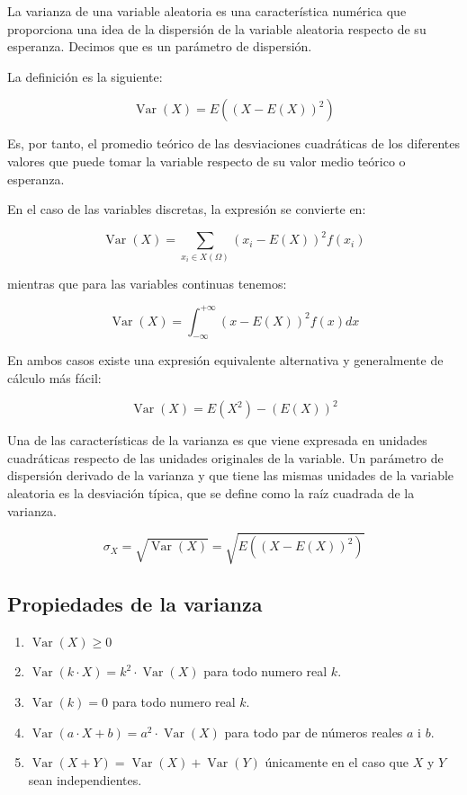\documentclass[
  a4paper,
  DIV=11,
  numbers=noendperiod]{scrreprt}
\providecommand{\tightlist}{%
  \setlength{\itemsep}{0pt}\setlength{\parskip}{0pt}}\usepackage{longtable,booktabs,array}
\begin{document}
La varianza de una variable aleatoria es una característica numérica que
proporciona una idea de la dispersión de la variable aleatoria respecto
de su esperanza. Decimos que es un parámetro de dispersión.

La definición es la siguiente:

\[
\operatorname{Var}(X)=E\left((X-E(X))^{2}\right)
\]

Es, por tanto, el promedio teórico de las desviaciones cuadráticas de
los diferentes valores que puede tomar la variable respecto de su valor
medio teórico o esperanza.

En el caso de las variables discretas, la expresión se convierte en:

\[
\operatorname{Var}(X)=\sum_{x_{i} \in X(\Omega)}\left(x_{i}-E(X)\right)^{2} f\left(x_{i}\right)
\]

mientras que para las variables continuas tenemos:

\[
\operatorname{Var}(X)=\int_{-\infty}^{+\infty}(x-E(X))^{2} f(x) d x
\]

En ambos casos existe una expresión equivalente alternativa y
generalmente de cálculo más fácil:

\[
\operatorname{Var}(X)=E\left(X^{2}\right)-(E(X))^{2}
\]

Una de las características de la varianza es que viene expresada en
unidades cuadráticas respecto de las unidades originales de la variable.
Un parámetro de dispersión derivado de la varianza y que tiene las
mismas unidades de la variable aleatoria es la desviación típica, que se
define como la raíz cuadrada de la varianza.

\[
\sigma_{X}=\sqrt{\operatorname{Var}(X)}=\sqrt{E\left((X-E(X))^{2}\right)}
\]

\subsection{Propiedades de la
varianza}\label{propiedades-de-la-varianza}

\begin{enumerate}
\def\labelenumi{\arabic{enumi}.}
\tightlist
\item
  \(\operatorname{Var}(X) \geq 0\)
\item
  \(\operatorname{Var}(k \cdot X)=k^{2} \cdot \operatorname{Var}(X)\)
  para todo numero real \(k\).
\item
  \(\operatorname{Var}(k)=0\) para todo numero real \(k\).
\item
  \(\operatorname{Var}(a \cdot X+b)=a^{2} \cdot \operatorname{Var}(X)\)
  para todo par de números reales \(a\) i \(b\).
\item
  \(\operatorname{Var}(X+Y)=\operatorname{Var}(X)+\operatorname{Var}(Y)\)
  únicamente en el caso que \(X\) y \(Y\) sean independientes.
\end{enumerate}
\end{document}
